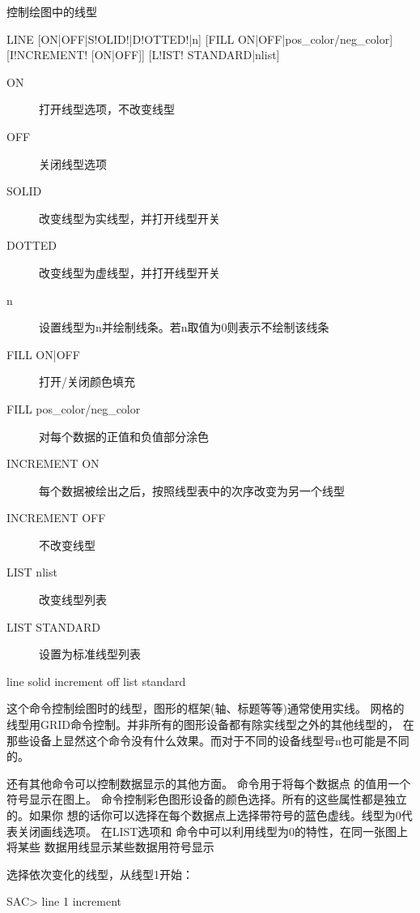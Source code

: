 \label{cmd:line}

控制绘图中的线型

\begin{SACSTX}
LINE [ON|OFF|S!OLID!|D!OTTED!|n] [FILL ON|OFF|pos\_color/neg\_color]
    [I!NCREMENT! [ON|OFF]] [L!IST! STANDARD|nlist]
\end{SACSTX}

\begin{description}
\item [ON] 打开线型选项，不改变线型
\item [OFF] 关闭线型选项
\item [SOLID] 改变线型为实线型，并打开线型开关
\item [DOTTED] 改变线型为虚线型，并打开线型开关
\item [n] 设置线型为n并绘制线条。若n取值为0则表示不绘制该线条
\item [FILL ON|OFF] 打开/关闭颜色填充
\item [FILL pos\_color/neg\_color] 对每个数据的正值和负值部分涂色
\item [INCREMENT ON] 每个数据被绘出之后，按照线型表中的次序改变为另一个线型
\item [INCREMENT OFF] 不改变线型
\item [LIST nlist] 改变线型列表
\item [LIST STANDARD] 设置为标准线型列表
\end{description}

\begin{SACDFT}
line solid increment off list standard
\end{SACDFT}

这个命令控制绘图时的线型，图形的框架(轴、标题等等)通常使用实线。
网格的线型用GRID命令控制。并非所有的图形设备都有除实线型之外的其他线型的，
在那些设备上显然这个命令没有什么效果。而对于不同的设备线型号n也可能是不同的。

还有其他命令可以控制数据显示的其他方面。 命令用于将每个数据点
的值用一个符号显示在图上。
 命令控制彩色图形设备的颜色选择。所有的这些属性都是独立的。如果你
想的话你可以选择在每个数据点上选择带符号的蓝色虚线。线型为0代表关闭画线选项。
在LIST选项和  命令中可以利用线型为0的特性，在同一张图上将某些
数据用线显示某些数据用符号显示

选择依次变化的线型，从线型1开始：
\begin{SACCode}
SAC> line 1 increment
\end{SACCode}

